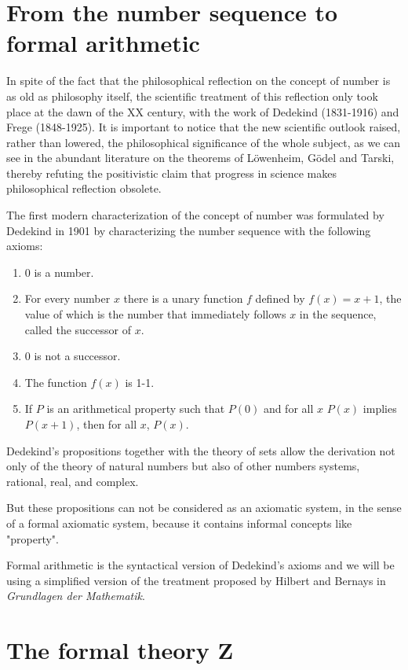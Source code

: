 \documentclass[12pt]{article}
\begin{document}
\section{From the number sequence to formal arithmetic}\normalsize   

In spite of the fact that the philosophical reflection on the concept of number is as old as philosophy itself, the scientific treatment of this reflection only took place at the dawn of the XX century, with the work of Dedekind (1831-1916) and Frege (1848-1925). It is important to notice that the new scientific outlook raised, rather than lowered, the philosophical significance of the whole subject, as we can see in the abundant literature on the theorems of L\"{o}wenheim, G\"{o}del and Tarski, thereby refuting the positivistic claim that progress in science makes philosophical reflection obsolete.

The first modern characterization of the concept of number was formulated by Dedekind in 1901 by characterizing the number sequence with the following axioms:

\begin{enumerate}
\item 0 is a number.
\item For every number $x$ there is a unary function $f$ defined by $f (x) =  x + 1$, the value of which is the number that immediately follows $x$ in the sequence, called the successor of $x$.
\item 0 is not a successor.
\item The function $f (x)$ is 1-1.
\item If $P$ is an arithmetical property such that $P(0)$ and for all $x$ $P(x)$ implies $P (x + 1)$, then for all $x$, $P(x)$.
\end{enumerate}

Dedekind's propositions together with the theory of sets allow the derivation not only of the theory of natural numbers but also of other numbers systems, rational, real, and complex.

But these propositions can not be considered as an axiomatic system, in the sense of a formal axiomatic system, because it contains informal concepts like "property".

Formal arithmetic is the syntactical version of Dedekind's axioms and we will be using a simplified version of the treatment proposed by Hilbert and Bernays in \emph{Grundlagen der Mathematik}.

\section{The formal theory \textbf{Z}}\normalsize
\end{document}
